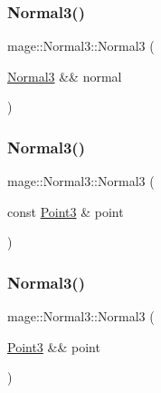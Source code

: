 \hypertarget{structmage_1_1_normal3_ab230659472ea5048c881beb5168e0ad3}{}\label{structmage_1_1_normal3_ab230659472ea5048c881beb5168e0ad3} 
\subsubsection{\texorpdfstring{Normal3()}{Normal3()}\hspace{0.1cm}{\footnotesize\ttfamily [4/10]}}
{\footnotesize\ttfamily mage\+::\+Normal3\+::\+Normal3 (\begin{DoxyParamCaption}\item[{\hyperlink{structmage_1_1_normal3}{Normal3} \&\&}]{normal }\end{DoxyParamCaption})}

\hypertarget{structmage_1_1_normal3_a1a58b2fcb3920ff68007257ae6434273}{}\label{structmage_1_1_normal3_a1a58b2fcb3920ff68007257ae6434273} 
\subsubsection{\texorpdfstring{Normal3()}{Normal3()}\hspace{0.1cm}{\footnotesize\ttfamily [5/10]}}
{\footnotesize\ttfamily mage\+::\+Normal3\+::\+Normal3 (\begin{DoxyParamCaption}\item[{const \hyperlink{structmage_1_1_point3}{Point3} \&}]{point }\end{DoxyParamCaption})\hspace{0.3cm}{\ttfamily [explicit]}}

\hypertarget{structmage_1_1_normal3_a37721c22caefb4d7ec421bed83f3a6c7}{}\label{structmage_1_1_normal3_a37721c22caefb4d7ec421bed83f3a6c7} 
\subsubsection{\texorpdfstring{Normal3()}{Normal3()}\hspace{0.1cm}{\footnotesize\ttfamily [6/10]}}
{\footnotesize\ttfamily mage\+::\+Normal3\+::\+Normal3 (\begin{DoxyParamCaption}\item[{\hyperlink{structmage_1_1_point3}{Point3} \&\&}]{point }\end{DoxyParamCaption})\hspace{0.3cm}{\ttfamily [explicit]}}

